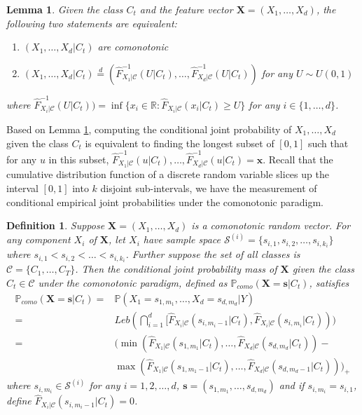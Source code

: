 \documentclass[twoside,11pt]{article}
\newtheorem{definition}{Definition}[subsection]
\newtheorem{lemma}{Lemma}[subsection]
\begin{document}
\begin{lemma}\label{cond_como}
Given the class $C_t$ and the feature vector $\mathbf{X}=(X_1,\dots,X_d)$, the following two statements are equivalent:
\begin{enumerate}
    \item $(X_1,\dots,X_d|C_t)$ are comonotonic
    \item $(X_1,\dots,X_d|C_t)\stackrel{d}{=}(\hat{F}_{X_1|\mathcal{C}}^{-1}(U|C_t),\dots,\hat{F}_{X_d|\mathcal{C}}^{-1}(U|C_t))$ for any $U\sim U(0,1)$
\end{enumerate}
where $\hat{F}_{X_i|\mathcal{C}}^{-1}(U|C_t))=\inf\{x_i\in\mathbb{R}:\hat{F}_{X_i|\mathcal{C}}(x_i|C_t)\geq U\}$ for any $i\in\{1,\dots,d\}$.
\end{lemma}

Based on Lemma \ref{cond_como}, computing the conditional joint probability of $X_1,\dots,X_d$ given the class $C_t$ is equivalent to finding the longest subset of $[0,1]$ such that for any $u$ in this subset, $\hat{F}_{X_1|\mathcal{C}}^{-1}(u|C_t),\dots,\hat{F}_{X_d|\mathcal{C}}^{-1}(u|C_t) = \mathbf{x}$. Recall that the cumulative distribution function of a discrete random variable slices up the interval $[0,1]$ into $k$ disjoint sub-intervals, we have the measurement of conditional empirical joint probabilities under the comonotonic paradigm.

\begin{definition}\label{joint_prob_como}
Suppose $\mathbf{X}=(X_1,\dots,X_d)$ is a comonotonic random vector. For any component $X_i$ of $\mathbf{X}$, let $X_i$ have sample space $\mathcal{S}^{(i)}=\{s_{i,1},s_{i,2},\dots,s_{i,k_i}\}$ where $s_{i,1}<s_{i,2}<\dots<s_{i,k_i}$. Further suppose the set of all classes is $\mathcal{C}=\{C_1,\dots,C_T\}$. Then the conditional joint probability mass of $\mathbf{X}$ given the class $C_t\in \mathcal{C}$ under the comonotonic paradigm, defined as $\mathbb{P}_{como}(\mathbf{X}=\mathbf{s}|C_t)$, satisfies
\begin{equation*}
\begin{aligned}
    \mathbb{P}_{como}(\mathbf{X}=\mathbf{s}|C_t) =&
    \mathbb{P}(X_1=s_{1,m_1},\dots,X_d=s_{d,m_d}|Y) \\
    =&Leb(\bigcap_{i=1}^d [\hat{F}_{X_i|\mathcal{C}}(s_{i,m_i-1}|C_t),\hat{F}_{X_i|\mathcal{C}}(s_{i,m_i}|C_t)))\\
    =&(\min(\hat{F}_{X_1|\mathcal{C}}(s_{1,m_1}|C_t),\dots,\hat{F}_{X_d|\mathcal{C}}(s_{d,m_d}|C_t))-\\
    &\max(\hat{F}_{X_1|\mathcal{C}}(s_{1,m_1-1}|C_t),\dots,\hat{F}_{X_d|\mathcal{C}}(s_{d,m_d-1}|C_t)))_+
\end{aligned}
\end{equation*}
where $s_{i,m_i}\in\mathcal{S}^{(i)}$ for any $i=1,2,\dots,d$, $\mathbf{s}=(s_{1,m_1},\dots,s_{d,m_d})$ and if $s_{i,m_i}=s_{i,1}$, define $\hat{F}_{X_i|\mathcal{C}}(s_{i,m_i-1}|C_t)=0$.
\end{definition}
\end{document}
